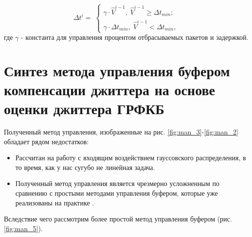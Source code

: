 \begin{equation}\label{eq41:syntes5}
\Delta t^i= \;
\begin{cases}
\gamma\cdot\hat{V}^{i-1}, \; \hat{V}^{i-1} \geq \Delta t_{min}; \\    
\gamma\cdot\Delta t_{min}, \;  \hat{V}^{i-1} < \Delta t_{min},    
\end{cases}
\end{equation}
\noindent где $\gamma$ - константа для управления процентом отбрасываемых пакетов и задержкой.


\section{Синтез метода управления буфером компенсации джиттера на основе оценки джиттера ГРФКБ}

Полученный метод управления, изображенные на рис. \ref{fig:man_3}-\ref{fig:man_2} обладает рядом недостатков:
\begin{itemize}
 \item Рассчитан на работу с входящим воздействием гауссовского распределения, в то время, как у нас сугубо не линейная задача.
 \item Полученный метод управления является чрезмерно усложненным по сравнению с простыми методами управления буфером, которые уже реализованы на практике \cite{Moon,jesuspinto1999algorithms,YoungJongChoChongKwanUn19941385,DBLP:journals/iet-com/Gade07,Hafskjold:2003:AAO:963600.963677}.  
\end{itemize}

Вследствие чего рассмотрим более простой метод управления буфером (рис. \ref{fig:man_5}).


